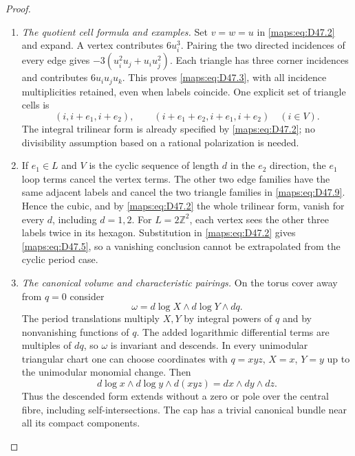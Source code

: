 \begin{proof}
\begin{enumerate}[label=\arabic*.,leftmargin=*]
\item \emph{The quotient cell formula and examples.}
Set $v=w=u$ in \eqref{maps:eq:D47.2} and expand. A vertex contributes
$6u_i^3$. Pairing the two directed incidences of every
edge gives $-3(u_i^2u_j+u_iu_j^2)$. Each triangle has
three corner incidences and contributes $6u_iu_ju_k$.
This proves \eqref{maps:eq:D47.3}, with all incidence multiplicities
retained, even when labels coincide.
One explicit set of triangle cells is
\[
 (i,i+e_1,i+e_2),\qquad
 (i+e_1+e_2,i+e_1,i+e_2)\quad(i\in V).                    \tag{D47.9}\label{maps:eq:D47.9}
\]
The integral trilinear form is already specified by
\eqref{maps:eq:D47.2}; no divisibility assumption based on a rational
polarization is needed.

\item If $e_1\in L$ and $V$ is the cyclic sequence of length
$d$ in the $e_2$ direction, the $e_1$ loop terms cancel
the vertex terms. The other two edge families have the
same adjacent labels and cancel the two triangle
families in \eqref{maps:eq:D47.9}. Hence the cubic, and by \eqref{maps:eq:D47.2}
the whole trilinear form, vanish for every $d$, including
$d=1,2$. For $L=2\mathbb Z^2$, each vertex sees the
other three labels twice in its hexagon. Substitution
in \eqref{maps:eq:D47.2} gives \eqref{maps:eq:D47.5}, so a vanishing conclusion
cannot be extrapolated from the cyclic period case.

\item \emph{The canonical volume and characteristic pairings.}
On the torus cover away from $q=0$ consider
\[
                    \omega=d\log X\wedge d\log Y\wedge dq.
                                                               \tag{D47.10}\label{maps:eq:D47.10}
\]
The period translations multiply $X,Y$ by integral
powers of $q$ and by nonvanishing functions of $q$.
The added logarithmic differential terms are multiples
of $dq$, so $\omega$ is invariant and descends.
In every unimodular triangular chart one can choose
coordinates with $q=xyz$, $X=x$, $Y=y$ up to the
unimodular monomial change. Then
\[
                    d\log x\wedge d\log y\wedge d(xyz)
                                 =dx\wedge dy\wedge dz.
                                                               \tag{D47.11}\label{maps:eq:D47.11}
\]
Thus the descended form extends without a zero or pole
over the central fibre, including self-intersections.
The cap has a trivial canonical bundle near all its
compact components.


\end{enumerate}
\end{proof}

